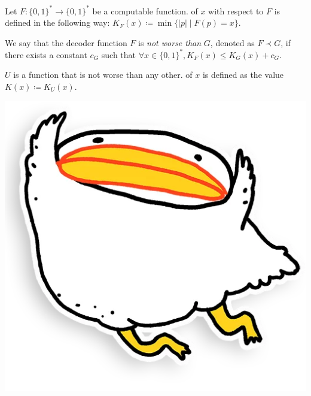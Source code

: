 








\begin{definition*}
    Let $F\colon \{0, 1\}^* \to \{0, 1\}^*$ be a computable function.
     of $x$ with respect to $F$ is defined in the following way: 
    $K_F(x) \coloneqq \min\{|p| \mid F(p) = x\}$.

    We say that the decoder function $F$ is \textit{not worse than} $G$, denoted as $F \prec G$, if
    there exists a constant $c_G$ such that $\forall x \in \{0, 1\}^*, K_F(x) \le K_G(x) + c_G$.

     $U$ is a function that is not worse than any
    other.  of $x$ is defined as the value $K(x) \coloneqq
    K_U(x)$.
\end{definition*}







\vspace{0.2cm}
\begin{center}
    \includegraphics[scale = 0.2]{../pics/utia-fly.png}    
\end{center}





